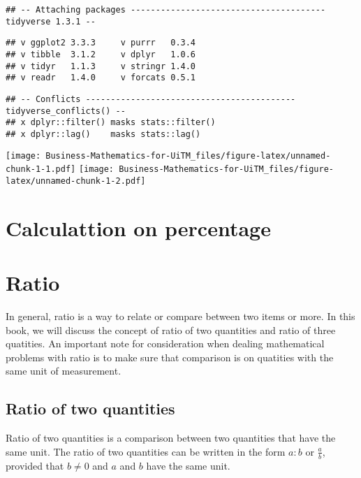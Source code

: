 \documentclass[
]{book}
\begin{document}
\begin{verbatim}
## -- Attaching packages --------------------------------------- tidyverse 1.3.1 --
\end{verbatim}

\begin{verbatim}
## v ggplot2 3.3.3     v purrr   0.3.4
## v tibble  3.1.2     v dplyr   1.0.6
## v tidyr   1.1.3     v stringr 1.4.0
## v readr   1.4.0     v forcats 0.5.1
\end{verbatim}

\begin{verbatim}
## -- Conflicts ------------------------------------------ tidyverse_conflicts() --
## x dplyr::filter() masks stats::filter()
## x dplyr::lag()    masks stats::lag()
\end{verbatim}

\texttt{[image: Business-Mathematics-for-UiTM\_files/figure-latex/unnamed-chunk-1-1.pdf]} \texttt{[image: Business-Mathematics-for-UiTM\_files/figure-latex/unnamed-chunk-1-2.pdf]}

\hypertarget{calculattion-on-percentage}{%
\section{Calculattion on percentage}\label{calculattion-on-percentage}}

\hypertarget{ratio}{%
\section{Ratio}\label{ratio}}

In general, ratio is a way to relate or compare between two items or more. In this book, we will discuss the concept of ratio of two quantities and ratio of three quatities. An important note for consideration when dealing mathematical problems with ratio is to make sure that comparison is on quatities with the same unit of measurement.

\hypertarget{ratio-of-two-quantities}{%
\subsection{Ratio of two quantities}\label{ratio-of-two-quantities}}

Ratio of two quantities is a comparison between two quantities that have the same unit. The ratio of two quantities can be written in the form \(a:b\) or \(\frac{a}{b}\), provided that \(b \neq 0\) and \(a\) and \(b\) have the same unit.
\end{document}
